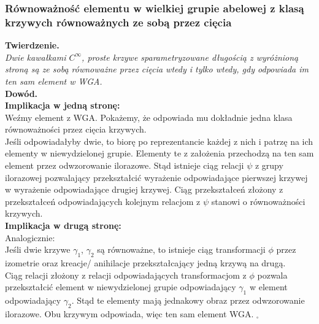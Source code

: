 \documentclass[a4paper, 12pt, twosided]{article}
\newcommand{\todo}[1]{\hfill \break \textbf{\Huge \textcolor{violet}{TO DO: #1} \hfill \break}
\normalsize}
\begin{document}
\subsubsection{Równoważność elementu w wielkiej grupie abelowej z klasą 
krzywych równoważnych ze sobą przez 
cięcia}
\textbf{Twierdzenie. } \\
\textit{Dwie kawałkami $C^\infty$, proste krzywe sparametryzowane długością z wyróżnioną stroną 
są ze sobą równoważne przez cięcia wtedy i tylko wtedy, gdy odpowiada im ten sam element w WGA.} \\
\textbf{Dowód.} \\
\textbf{Implikacja w jedną stronę:}\\ 
Weźmy element z WGA. Pokażemy, że odpowiada mu dokładnie 
 jedna klasa równoważności przez cięcia
krzywych.
\\
Jeśli odpowiadałyby dwie, to biorę po reprezentancie każdej z nich i patrzę na ich elementy w 
niewydzielonej
grupie. Elementy te z założenia przechodzą na ten sam element przez odwzorowanie ilorazowe.  
Stąd istnieje ciąg relacji $\psi$ z grupy ilorazowej pozwalający przekształcić wyrażenie
 odpowiadające 
pierwszej krzywej w wyrażenie odpowiadające drugiej krzywej.
Ciąg przekształceń złożony z przekształceń odpowiadających kolejnym relacjom 
z $\psi$ stanowi o równoważności krzywych. \\
\textbf{Implikacja w drugą stronę:} \\
Analogicznie: \\
Jeśli dwie krzywe $\gamma_1$, $\gamma_2$ są równoważne, to istnieje ciąg transformacji $\phi$ przez 
 izometrie oraz kreacje/
anihilacje przekształcający jedną krzywą na drugą. \\
Ciąg relacji złożony z relacji odpowiadających transformacjom z $\phi$ pozwala przekształcić 
element w niewydzielonej grupie odpowiadający $\gamma_1$ w element odpowiadający $\gamma_2$. 
Stąd te elementy mają jednakowy obraz przez odwzorowanie ilorazowe. Obu krzywym 
odpowiada, więc ten sam element WGA. $_\square$
\end{document}

